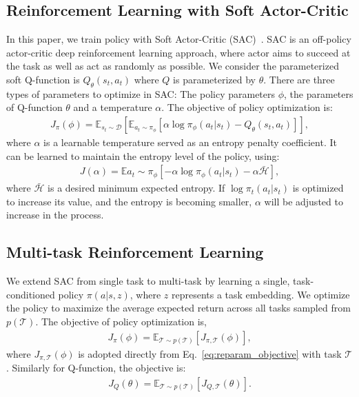 \documentclass{article}
\newcommand{\task}{\mathcal{T}}
\newcommand{\E}{\mathbb{E}}
\begin{document}
\vspace{-0.07in}
\subsection{Reinforcement Learning with Soft Actor-Critic} 
\vspace{-0.07in}

In this paper, we train policy with Soft Actor-Critic (SAC)~\cite{DBLP:journals/corr/abs-1801-01290}. SAC is an off-policy actor-critic deep reinforcement learning approach, where actor aims to succeed at the task as well as act as randomly as possible. We consider the parameterized soft Q-function is $Q_\theta(s_t, a_t)$ where $Q$ is parameterized by $\theta$. There are three types of parameters to optimize in SAC: The policy parameters $\phi$, the parameters of Q-function $\theta$ and a temperature $\alpha$. The objective of policy optimization is:
\vspace{-0.05in}
\begin{align}
J_\pi(\phi) = \E_{s_t\sim\mathcal{D}}\left[\E_{a_t\sim\pi_\phi}[\alpha \log \pi_\phi(a_t|s_t) - Q_\theta(s_t, a_t)]\right],
\label{eq:reparam_objective}
\end{align}
where $\alpha$ is a learnable temperature served as an entropy penalty coefficient. It can be learned to maintain the entropy level of the policy, using:
\vspace{-0.05in}
\begin{align}
J(\alpha)  = \E{a_t \sim \pi_\phi} \left[ - \alpha\log\pi_\phi(a_t|s_t) - \alpha \bar{\mathcal{H}}\right],
\label{eq:ecsac:alpha_objective}
\end{align}
where $\bar{\mathcal{H}}$ is a desired minimum expected entropy. If $\log \pi_t(a_t|s_t)$ is optimized to increase its value, and the entropy is becoming smaller, $\alpha$ will be adjusted to increase in the process. 


\vspace{-0.07in}
\subsection{Multi-task Reinforcement Learning}
\vspace{-0.07in}

We extend SAC from single task to multi-task by learning a single, task-conditioned policy $\pi(a|s, z)$, where $z$ represents a task embedding. We optimize the policy to maximize the average expected return across all tasks sampled from $p(\task)$.
The objective of policy optimization is,
\vspace{-0.05in}
\begin{align}
J_\pi(\phi)=\mathbb{E}_{\task \sim p(\task)} \left[ J_{\pi, \task}(\phi) \right],
\label{eq:jphi}
\end{align}
where $J_{\pi, \task}(\phi)$ is adopted directly from Eq.~\ref{eq:reparam_objective} with task $\task$. Similarly for  Q-function, the objective is:
\vspace{-0.05in}
\begin{align}
J_Q(\theta)=\mathbb{E}_{\task \sim p(\task)} \left[ J_{Q, \task}(\theta) \right].
\label{eq:jtheta}
\end{align}
 
\end{document}
